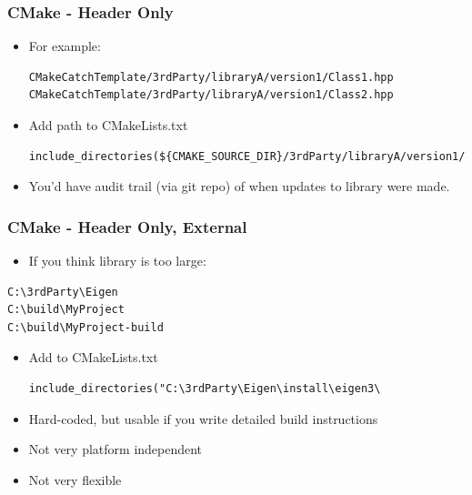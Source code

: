 \subsubsection{CMake - Header Only}\label{cmake---header-only}

\begin{itemize}
\item
  For example:

\begin{verbatim}
CMakeCatchTemplate/3rdParty/libraryA/version1/Class1.hpp
CMakeCatchTemplate/3rdParty/libraryA/version1/Class2.hpp
\end{verbatim}
\item
  Add path to CMakeLists.txt

\begin{verbatim}
include_directories(${CMAKE_SOURCE_DIR}/3rdParty/libraryA/version1/)
\end{verbatim}
\item
  You'd have audit trail (via git repo) of when updates to library were
  made.
\end{itemize}

\subsubsection{CMake - Header Only,
External}\label{cmake---header-only-external}

\begin{itemize}
\itemsep1pt\parskip0pt
\item
  If you think library is too large:
\end{itemize}

\begin{verbatim}
C:\3rdParty\Eigen
C:\build\MyProject
C:\build\MyProject-build
\end{verbatim}

\begin{itemize}
\item
  Add to CMakeLists.txt

\begin{verbatim}
include_directories("C:\3rdParty\Eigen\install\eigen3\
\end{verbatim}
\item
  Hard-coded, but usable if you write detailed build instructions
\item
  Not very platform independent
\item
  Not very flexible
\end{itemize}

